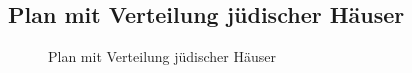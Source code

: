 \documentclass[
  letterpaper,
  DIV=11,
  numbers=noendperiod]{scrartcl}
\begin{document}
\subsection{Plan mit Verteilung jüdischer
Häuser}\label{plan-mit-verteilung-juxfcdischer-huxe4user}

\begin{figure}


\caption{\label{fig-plan-mit-verteilung-juedischer-haeuser}Plan mit
Verteilung jüdischer Häuser}

\end{figure}%
\end{document}
